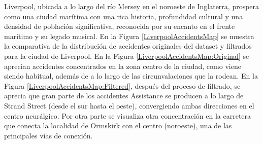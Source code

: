 \documentclass{uathesis-es}
\begin{document}
{Liverpool, ubicada a lo largo del río Mersey en el noroeste de Inglaterra, prospera como una ciudad marítima con una rica historia, profundidad cultural y una densidad de población significativa, reconocida por su encanto en el frente marítimo y su legado musical. En la Figura \ref{LiverpoolAccidentsMap} se muestra la comparativa de la distribución de accidentes originales del dataset y filtrados para la ciudad de Liverpool. En la Figura \ref{LiverpoolAccidentsMap:Original} se aprecian accidentes concentrados en la zona centro de la ciudad, como viene siendo habitual, además de a lo largo de las circunvalaciones que la rodean. En la Figura \ref{LiverpoolAccidentsMap:Filtered}, después del proceso de filtrado, se aprecia que gran parte de los accidentes Assistance se producen a lo largo de Strand Street (desde el sur hasta el oeste), convergiendo ambas direcciones en el centro neurálgico. Por otra parte se visualiza otra concentración en la carretera que conecta la localidad de Ormskirk con el centro (noroeste), una de las principales vías de conexión.


}
\end{document}

